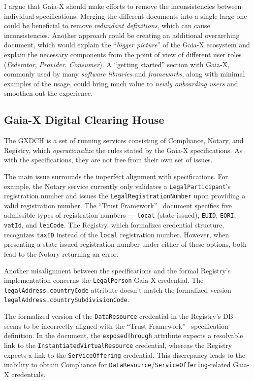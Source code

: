 I argue that Gaia-X should make efforts to remove the inconsistencies between individual specifications.
Merging the different documents into a single large one could be beneficial to remove \textit{redundant definitions}, which can cause inconsistencies.
Another approach could be creating an additional overarching document, which would explain the ``\textit{bigger picture}'' of the Gaia-X ecosystem and explain the necessary components from the point of view of different user roles (\textit{Federator}, \textit{Provider}, \textit{Consumer}).
A ``getting started'' section with Gaia-X, commonly used by many \textit{software libraries} and \textit{frameworks}, along with minimal examples of the usage, could bring much value to \textit{newly onboarding users} and smoothen out the experience.

\subsection{Gaia-X Digital Clearing House}\label{subsec:gaia-x-digital-clearing-house}

The GXDCH is a set of running services consisting of Compliance, Notary, and Registry, which \textit{operationalize} the rules stated by the Gaia-X specifications.
As with the specifications, they are not free from their own set of issues.

The main issue surrounds the imperfect alignment with specifications.
For example, the Notary service currently only validates a \texttt{LegalParticipant}'s registration number and issues the \texttt{LegalRegistrationNumber} upon providing a valid registration number.
The ``Trust Framework''~\cite{gaiax_trust_framework} document specifies five admissible types of registration numbers --- \texttt{local} (state-issued), \texttt{EUID}, \texttt{EORI}, \texttt{vatId}, and \texttt{leiCode}.
The Registry, which formalizes credential structure, recognizes \texttt{taxID} instead of the \texttt{local} registration number.
However, when presenting a state-issued registration number under either of these options, both lead to the Notary returning an error.

Another misalignment between the specifications and the formal Registry's implementation concerns the \texttt{LegalPerson} Gaia-X credential.
The \texttt{legalAddress.countryCode} attribute doesn't match the formalized version \texttt{legalAddress.countrySubdivisionCode}.

The formalized version of the \texttt{DataResource} credential in the Registry's DB seems to be incorrectly aligned with the ``Trust Framework''~\cite{gaiax_trust_framework} specification definition.
In the document, the \texttt{exposedThrough} attribute expects a resolvable link to the \texttt{InstantiatedVirtualResource} credential, whereas the Registry expects a link to the \texttt{ServiceOffering} credential.
This discrepancy leads to the inability to obtain Compliance for \texttt{DataResource}/\texttt{ServiceOffering}-related Gaia-X credentials.


